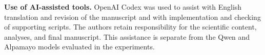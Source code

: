 \noindent\textbf{Use of AI-assisted tools.}
OpenAI Codex was used to assist with English translation and revision of the
manuscript and with implementation and checking of supporting scripts. The
authors retain responsibility for the scientific content, analyses, and final
manuscript. This assistance is separate from the Qwen and Alpamayo models
evaluated in the experiments.
